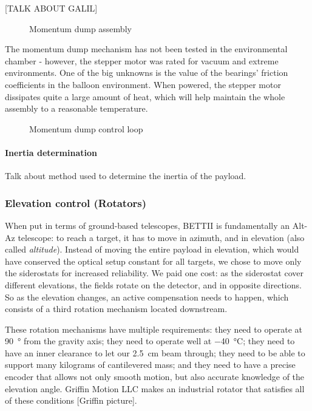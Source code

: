 [TALK ABOUT GALIL]
\begin{figure}[!ht]
	\centering
	
	\caption[Momentum dump assembly]{Momentum dump assembly}
	\label{fig:rotator}
    \end{figure}

The momentum dump mechanism has not been tested in the environmental chamber - however, the stepper motor was rated for vacuum and extreme environments. One of the big unknowns is the value of the bearings' friction coefficients in the balloon environment. When powered, the stepper motor dissipates quite a large amount of heat, which will help maintain the whole assembly to a reasonable temperature. 

\begin{figure}[!ht]
	\centering
	
	\caption[Momentum dump PID]{Momentum dump control loop}
	\label{fig:MomDumpPID}
    \end{figure}


\paragraph{Inertia determination}

Talk about method used to determine the inertia of the payload.

\subsubsection{Elevation control (Rotators)}

When put in terms of ground-based telescopes, BETTII is fundamentally an Alt-Az telescope: to reach a target, it has to move in azimuth, and in elevation (also called \textit{altitude}). Instead of moving the entire payload in elevation, which would have conserved the optical setup constant for all targets, we chose to move only the siderostats for increased reliability. We paid one cost: as the siderostat cover different elevations, the fields rotate on the detector, and in opposite directions. So as the elevation changes, an active compensation needs to happen, which consists of a third rotation mechanism located downstream.

These rotation mechanisms have multiple requirements: they need to operate at \SI{90}{\degree} from the gravity axis; they need to operate well at \SI{-40}{\celsius}; they need to have an inner clearance to let our \SI{2.5}{\cm} beam through; they need to be able to support many kilograms of cantilevered mass; and they need to have a precise encoder that allows not only smooth motion, but also accurate knowledge of the elevation angle. Griffin Motion LLC makes an industrial rotator that satisfies all of these conditions [Griffin picture].

